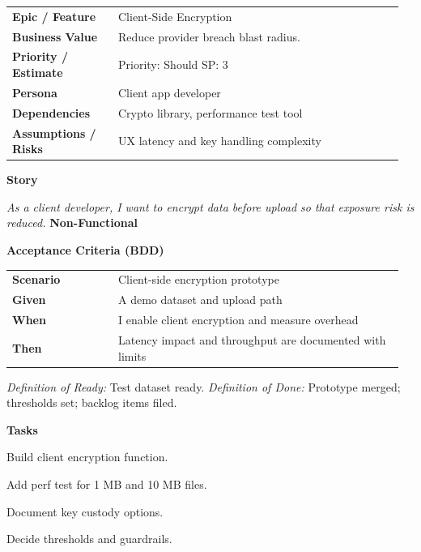 \documentclass[11pt,letterpaper]{article}
\makeatletter
\newenvironment{kvtable}{%
  \begin{tabular}{@{}>{\bfseries\arraybackslash}p{0.26\linewidth} p{0.70\linewidth}@{}}
}{\end{tabular}}
\newenvironment{bdd}{%
  \begin{tabular}{@{}>{\bfseries\arraybackslash}p{0.26\linewidth} p{0.70\linewidth}@{}}
}{\end{tabular}}
\newcommand{\DoRDoD}[2]{%
  \vspace{0.35em}
  {\footnotesize\color{Muted}%
    \textit{Definition of Ready:} #1 \; \textbullet\;
    \textit{Definition of Done:} #2%
  }%
}
\newenvironment{storycard}[2]{%
  \begin{tcolorbox}[cloudcard, title={#1 --- #2}]%
}{\end{tcolorbox}}
\newcommand{\sectionlabel}[1]{\vspace{0.35em}\textbf{#1}\par}
\makeatother
\begin{document}
\begin{storycard}{CCS-13}{Ch. 13 — User-Side Key Controls}
\begin{kvtable}
Epic / Feature & Client-Side Encryption\\
Business Value & Reduce provider breach blast radius.\\
Priority / Estimate & Priority: Should \quad SP: 3\\
Persona & Client app developer\\
Dependencies & Crypto library, performance test tool\\
Assumptions / Risks & UX latency and key handling complexity\\
\end{kvtable}
\sectionlabel{Story}
\textit{As a client developer, I want to encrypt data before upload so that exposure risk is reduced.}
\sectionlabel{Non-Functional}\;\;
\sectionlabel{Acceptance Criteria (BDD)}
\begin{bdd}
Scenario & Client-side encryption prototype\\
Given & A demo dataset and upload path\\
When & I enable client encryption and measure overhead\\
Then & Latency impact and throughput are documented with limits\\
\end{bdd}
\DoRDoD{Test dataset ready.}{Prototype merged; thresholds set; backlog items filed.}
\sectionlabel{Tasks}
\begin{checklist}
\item Build client encryption function.
\item Add perf test for 1 MB and 10 MB files.
\item Document key custody options.
\item Decide thresholds and guardrails.
\end{checklist}
\end{storycard}
\end{document}
